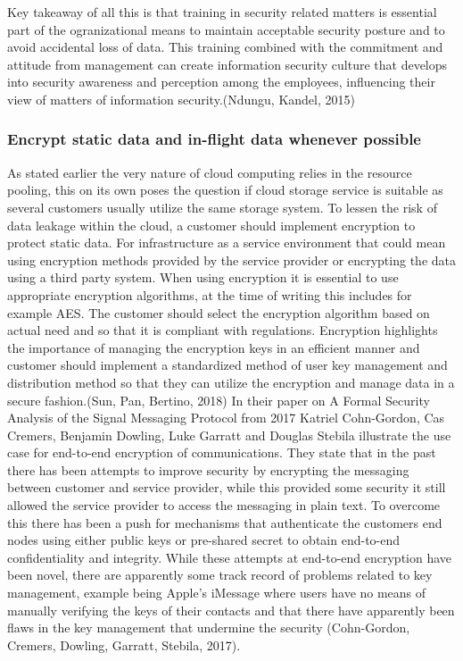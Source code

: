 \documentclass{article}
\begin{document}
\par
Key takeaway of all this is that training in security related matters is essential part of the ogranizational means to maintain acceptable security posture and to avoid accidental loss of data. This training combined with the commitment and attitude from management can create information security culture that develops into security awareness and perception among the employees, influencing their view of matters of information security.(Ndungu, Kandel, 2015) 
\subsubsection{Encrypt static data and in-flight data whenever possible}
As stated earlier the very nature of cloud computing relies in the resource pooling, this on its own poses the question if cloud storage service is suitable as several customers usually utilize the same storage system. To lessen the risk of data leakage within the cloud, a customer should implement encryption to protect static data. For infrastructure as a service environment that could mean using encryption methods provided by the service provider or encrypting the data using a third party system. When using encryption it is essential to use appropriate encryption algorithms, at the time of writing this includes for example AES. The customer should select the encryption algorithm based on actual need and so that it is compliant with regulations. Encryption highlights the importance of managing the encryption keys in an efficient manner and customer should implement a standardized method of user key management and distribution method so that they can utilize the encryption and manage data in a secure fashion.(Sun, Pan, Bertino, 2018)
In their paper on A Formal Security Analysis of the Signal Messaging Protocol from 2017 Katriel Cohn-Gordon, Cas Cremers, Benjamin Dowling, Luke Garratt and Douglas Stebila illustrate the use case for end-to-end encryption of communications.
They state that in the past there has been attempts to improve security by encrypting the messaging between customer and service provider, while this provided some security it still allowed the service provider to access the messaging in plain text.
To overcome this there has been a push for mechanisms that authenticate the customers end nodes using either public keys or pre-shared secret to obtain end-to-end confidentiality and integrity.
While these attempts at end-to-end encryption have been novel, there are apparently some track record of problems related to key management, example being Apple's iMessage where users have no means of manually verifying the keys of their contacts and that there have apparently been flaws in the key management that undermine the security (Cohn-Gordon, Cremers, Dowling, Garratt, Stebila, 2017).
\end{document}
